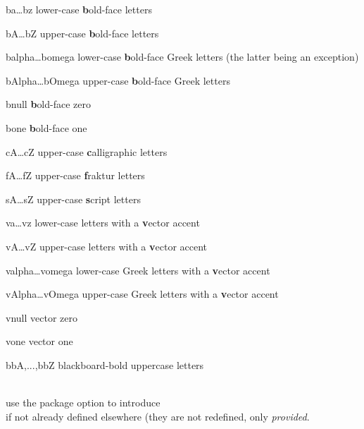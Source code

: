\documentclass[english,a4paper,DIV=12,parskip=full,oneside]{scrartcl}
\begin{document}
    \begin{commandlist}
        \item[ba\ldots bz] lower-case \textbf{b}old-face letters \mathCodeExample{\br, \bf}
        \item[bA\ldots bZ] upper-case \textbf{b}old-face letters \mathCodeExample{\bR, \bF}
        \item[balpha\ldots bomega] lower-case \textbf{b}old-face Greek letters \mathCodeExample{\balpha,\boldeta} (the latter being an exception)
        \item[bAlpha\ldots bOmega] upper-case \textbf{b}old-face Greek letters \mathCodeExample{\bGamma,\bDelta}
        \item[bnull] \textbf{b}old-face zero \mathCodeExample{\bnull}
        \item[bone] \textbf{b}old-face one \mathCodeExample{\bone}
        \item[cA\ldots cZ] upper-case \textbf{c}alligraphic letters \mathCodeExample{\cM, \cN}\\
        \item[fA\ldots fZ] upper-case \textbf{f}raktur letters \mathCodeExample{\fM, \fN, \fX}\\
        \item[sA\ldots sZ] upper-case \textbf{s}cript letters \mathCodeExample{\sM, \sN, \sX}\\
        \item[va\ldots vz] lower-case letters with a \textbf{v}ector accent \mathCodeExample{\va,\vb}
        \item[vA\ldots vZ] upper-case letters with a \textbf{v}ector accent \mathCodeExample{\vA,\vB}
        \item[valpha\ldots vomega] lower-case Greek letters with a \textbf{v}ector accent \mathCodeExample{\valpha,\vbeta}
        \item[vAlpha\ldots vOmega] upper-case Greek letters with a \textbf{v}ector accent \mathCodeExample{\vGamma,\vDelta}
        \item[vnull] vector zero \mathCodeExample{\vnull}
        \item[vone] vector one \mathCodeExample{\vone}
        \item[bbA,...,bbZ] blackboard-bold uppercase letters\par\mathCodeExample{\bbC,\bbK,\bbN,\bbQ,\bbR,\bbS,\bbZ}
        \\[.5\baselineskip] use the package option  to introduce\\
        \mathCodeExample{\C,\K,\N,\Q,\R,\Z} if not already defined elsewhere (\ie they are not redefined, only \emph{provided}.
    \end{commandlist}
\end{document}
